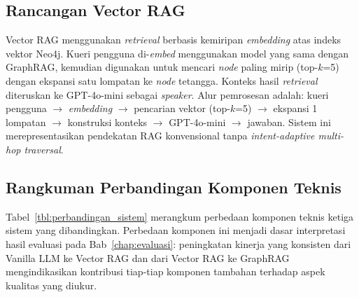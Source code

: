 \subsection{Rancangan Vector RAG}
\label{subsec:rancangan-vector-rag}

Vector RAG menggunakan \textit{retrieval} berbasis kemiripan \textit{embedding} atas
indeks vektor Neo4j. Kueri pengguna di-\textit{embed} menggunakan model yang sama dengan
GraphRAG, kemudian digunakan untuk mencari \textit{node} paling mirip (top-$k$=5)
dengan ekspansi satu lompatan ke \textit{node} tetangga.
Konteks hasil \textit{retrieval} diteruskan ke GPT-4o-mini sebagai \textit{speaker}.
Alur pemrosesan adalah: kueri pengguna $\rightarrow$ \textit{embedding}
$\rightarrow$ pencarian vektor (top-$k$=5) $\rightarrow$ ekspansi 1 lompatan
$\rightarrow$ konstruksi konteks $\rightarrow$ GPT-4o-mini $\rightarrow$ jawaban.
Sistem ini merepresentasikan pendekatan RAG konvensional tanpa
\textit{intent-adaptive multi-hop traversal}.

\subsection{Rangkuman Perbandingan Komponen Teknis}
\label{subsec:perbandingan-komponen}

Tabel~\ref{tbl:perbandingan_sistem} merangkum perbedaan komponen teknis ketiga sistem
yang dibandingkan. Perbedaan komponen ini menjadi dasar interpretasi hasil evaluasi
pada Bab~\ref{chap:evaluasi}: peningkatan kinerja yang konsisten dari Vanilla LLM ke
Vector RAG dan dari Vector RAG ke GraphRAG mengindikasikan kontribusi tiap-tiap
komponen tambahan terhadap aspek kualitas yang diukur.

